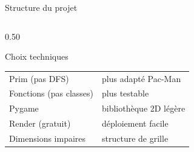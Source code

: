 \documentclass[aspectratio=169, 12pt]{beamer}
\begin{document}
\begin{frame}{Structure du projet}
\begin{columns}[T]
\begin{column}{0.50\textwidth}
\vspace{0.3cm}
\begin{block}{\small Choix techniques}
\scriptsize
\begin{tabular}{ll}
Prim (pas DFS) & plus adapté Pac-Man \\
Fonctions (pas classes) & plus testable \\
Pygame & bibliothèque 2D légère \\
Render (gratuit) & déploiement facile \\
Dimensions impaires & structure de grille \\
\end{tabular}
\end{block}
\end{column}
\end{columns}

\end{frame}
\end{document}
